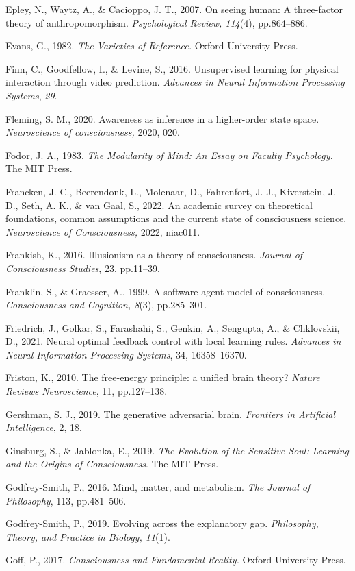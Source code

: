 \documentclass[12pt]{article}
\begin{document}
Epley, N., Waytz, A., \& Cacioppo, J. T., 2007. On seeing human: A
three-factor theory of anthropomorphism. \emph{Psychological Review,
114}(4), pp.864--886.

Evans, G., 1982. \emph{The Varieties of Reference.} Oxford University
Press.

Finn, C., Goodfellow, I., \& Levine, S., 2016. Unsupervised learning for
physical interaction through video prediction. \emph{Advances in Neural
Information Processing Systems}, \emph{29}.

Fleming, S. M., 2020. Awareness as inference in a higher-order state
space. \emph{Neuroscience of consciousness,} 2020, 020.

Fodor, J. A., 1983. \emph{The Modularity of Mind: An Essay on Faculty
Psychology.} The MIT Press.

Francken, J. C., Beerendonk, L., Molenaar, D., Fahrenfort, J. J.,
Kiverstein, J. D., Seth, A. K., \& van Gaal, S., 2022. An academic
survey on theoretical foundations, common assumptions and the current
state of consciousness science. \emph{Neuroscience of Consciousness,}
2022, niac011.

Frankish, K., 2016. Illusionism as a theory of consciousness.
\emph{Journal of Consciousness Studies}, 23, pp.11--39.

Franklin, S., \& Graesser, A., 1999. A software agent model of
consciousness. \emph{Consciousness and Cognition, 8}(3), pp.285--301.

Friedrich, J., Golkar, S., Farashahi, S., Genkin, A., Sengupta, A., \&
Chklovskii, D., 2021. Neural optimal feedback control with local
learning rules. \emph{Advances in Neural Information Processing
Systems}, 34, 16358--16370.

Friston, K., 2010. The free-energy principle: a unified brain theory?
\emph{Nature Reviews Neuroscience}, 11, pp.127--138.

Gershman, S. J., 2019. The generative adversarial brain. \emph{Frontiers
in Artificial Intelligence}, 2, 18.

Ginsburg, S., \& Jablonka, E., 2019. \emph{The Evolution of the
Sensitive Soul: Learning and the Origins of Consciousness}. The MIT
Press.

Godfrey-Smith, P., 2016. Mind, matter, and metabolism. \emph{The Journal
of Philosophy}, 113, pp.481--506.

Godfrey-Smith, P., 2019. Evolving across the explanatory gap.
\emph{Philosophy, Theory, and Practice in Biology, 11}(1).

Goff, P., 2017. \emph{Consciousness and Fundamental Reality.} Oxford
University Press.
\end{document}
